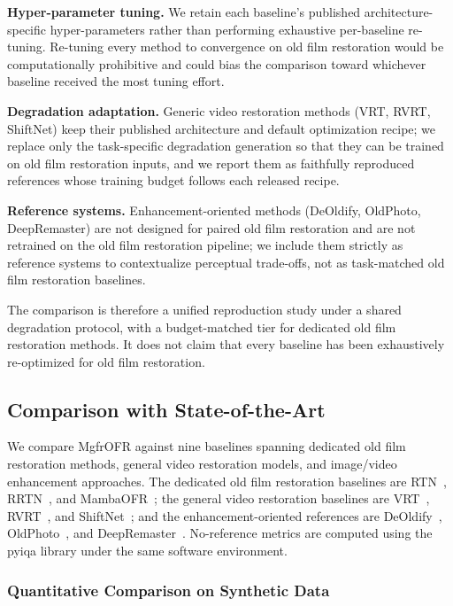 \documentclass[symmetry,article,submit,pdftex,moreauthors]{Definitions/mdpi}
\begin{document}
\textbf{Hyper-parameter tuning.} We retain each baseline's published architecture-specific hyper-parameters rather than performing exhaustive per-baseline re-tuning. Re-tuning every method to convergence on old film restoration would be computationally prohibitive and could bias the comparison toward whichever baseline received the most tuning effort.

\textbf{Degradation adaptation.} Generic video restoration methods (VRT, RVRT, ShiftNet) keep their published architecture and default optimization recipe; we replace only the task-specific degradation generation so that they can be trained on old film restoration inputs, and we report them as faithfully reproduced references whose training budget follows each released recipe.

\textbf{Reference systems.} Enhancement-oriented methods (DeOldify, OldPhoto, DeepRemaster) are not designed for paired old film restoration and are not retrained on the old film restoration pipeline; we include them strictly as reference systems to contextualize perceptual trade-offs, not as task-matched old film restoration baselines.

The comparison is therefore a unified reproduction study under a shared degradation protocol, with a budget-matched tier for dedicated old film restoration methods. It does not claim that every baseline has been exhaustively re-optimized for old film restoration.

\subsection{Comparison with State-of-the-Art}
\label{subsec:comparison_sota}

We compare MgfrOFR against nine baselines spanning dedicated old film restoration methods, general video restoration models, and image/video enhancement approaches. The dedicated old film restoration baselines are RTN~\cite{wan2022rtn}, RRTN~\cite{lin2024rrtn}, and MambaOFR~\cite{mao2025mambaofr}; the general video restoration baselines are VRT~\cite{liang2024vrt}, RVRT~\cite{liang2022rvrt}, and ShiftNet~\cite{li2023shiftnet}; and the enhancement-oriented references are DeOldify~\cite{jantic2019deoldify}, OldPhoto~\cite{wan2023oldphotopami}, and DeepRemaster~\cite{iizuka2019deepremaster}. No-reference metrics are computed using the pyiqa library under the same software environment.

\subsubsection{Quantitative Comparison on Synthetic Data}
\end{document}
